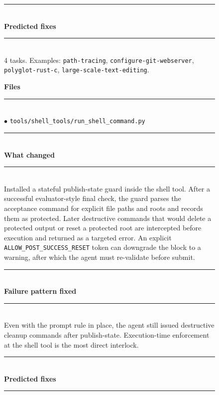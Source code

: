 \begin{figure}[t]
\begin{tcbraster}
\begin{tcolorbox}[colback=aheSky!18,colframe=aheNavy,colbacktitle=aheNavy,
                          title={\scriptsize\textbf{chg-7, iteration 5, commit \texttt{3ba3a90}, level: prompt + tool descriptor}}]
            \rule{\linewidth}{0.3pt}\\
            \textbf{\textcolor{aheNavy}{Predicted fixes}} \\
            \rule{\linewidth}{0.3pt}\\[1pt]
            4 tasks. Examples: \texttt{path-tracing}, \texttt{configure-git-webserver}, \texttt{polyglot-rust-c}, \texttt{large-scale-text-editing}.
        \end{tcolorbox}
        \begin{tcolorbox}[colback=aheTeal!12,colframe=aheBlue,colbacktitle=aheBlue,
                          title={\scriptsize\textbf{chg-8, iteration 5, commit \texttt{4e0aab9}, level: tool implementation}}]
            \textbf{\textcolor{aheBlue}{Files}} \\
            \rule{\linewidth}{0.3pt}\\[1pt]
            $\bullet$ \texttt{tools/shell\_tools/run\_shell\_command.py} \\[3pt]
            \rule{\linewidth}{0.3pt}\\
            \textbf{\textcolor{aheBlue}{What changed}} \\
            \rule{\linewidth}{0.3pt}\\[1pt]
            Installed a stateful publish-state guard inside the shell tool. After a successful evaluator-style final check, the guard parses the acceptance command for explicit file paths and roots and records them as protected. Later destructive commands that would delete a protected output or reset a protected root are intercepted before execution and returned as a targeted error. An explicit \texttt{ALLOW\_POST\_SUCCESS\_RESET} token can downgrade the block to a warning, after which the agent must re-validate before submit. \\[3pt]
            \rule{\linewidth}{0.3pt}\\
            \textbf{\textcolor{aheBlue}{Failure pattern fixed}} \\
            \rule{\linewidth}{0.3pt}\\[1pt]
            Even with the prompt rule in place, the agent still issued destructive cleanup commands after publish-state. Execution-time enforcement at the shell tool is the most direct interlock. \\[3pt]
            \rule{\linewidth}{0.3pt}\\
            \textbf{\textcolor{aheBlue}{Predicted fixes}} \\
            \rule{\linewidth}{0.3pt}\\[1pt]

\end{tcolorbox}
\end{tcbraster}
\end{figure}

